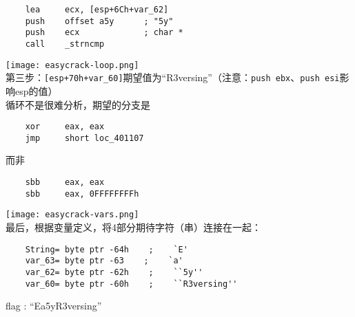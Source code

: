 \begin{enumerate}
\begin{lstlisting}
	lea     ecx, [esp+6Ch+var_62]
	push    offset a5y      ; "5y"
	push    ecx             ; char *
	call    _strncmp
	\end{lstlisting}
	\texttt{[image: easycrack-loop.png]} \\
	第三步：\lstinline$[esp+70h+var_60]$期望值为“R3versing”（注意：\lstinline$push ebx$、\lstinline$push esi$影响esp的值）\\
	循环不是很难分析，期望的分支是
	\begin{lstlisting}
	xor     eax, eax
	jmp     short loc_401107
	\end{lstlisting}
	而非
	\begin{lstlisting}
	sbb     eax, eax
	sbb     eax, 0FFFFFFFFh
	\end{lstlisting}
	
	\texttt{[image: easycrack-vars.png]} \\
	最后，根据变量定义，将4部分期待字符（串）连接在一起：
	\begin{lstlisting}
	String= byte ptr -64h    ;    `E'
	var_63= byte ptr -63    ;    `a'
	var_62= byte ptr -62h    ;    ``5y''
	var_60= byte ptr -60h    ;    ``R3versing''
	\end{lstlisting}
	flag : ``Ea5yR3versing''
\end{enumerate}